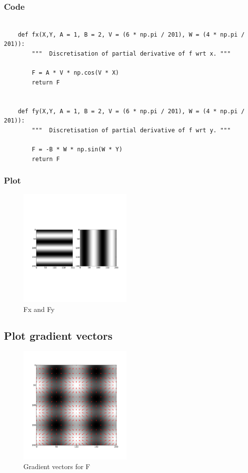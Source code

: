 \documentclass[abstract=true]{scrartcl}
\begin{document}
        \subsubsection{Code}
        \begin{verbatim}

    def fx(X,Y, A = 1, B = 2, V = (6 * np.pi / 201), W = (4 * np.pi / 201)):
        """  Discretisation of partial derivative of f wrt x. """
        
        F = A * V * np.cos(V * X)
        return F


    def fy(X,Y, A = 1, B = 2, V = (6 * np.pi / 201), W = (4 * np.pi / 201)):
        """  Discretisation of partial derivative of f wrt y. """

        F = -B * W * np.sin(W * Y)
        return F

        \end{verbatim}

        \subsubsection{Plot}
        \begin{figure}
          \centering
          \includegraphics[width=0.5\textwidth]{../images/0_fx_and_fy}
          \caption{Fx and Fy}
        \end{figure}

    \subsection{Plot gradient vectors}

        \begin{figure}
          \centering
          \includegraphics[width=0.5\textwidth]{../images/1_quiver}
          \caption{Gradient vectors for F}
        \end{figure}
\end{document}
